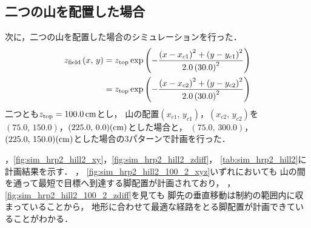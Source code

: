 \documentclass[autodetect-engine,dvipdfmx-if-dvi,ja=standard,a4j,jbase=11pt,magstyle=nomag*]{bxjsreport}
\begin{document}
\subsection{二つの山を配置した場合}
次に，二つの山を配置した場合のシミュレーションを行った．
\begin{equation}
    \begin{aligned}
        z_{\mathrm{field}}\left( x ,\, y \right) & = z_{\mathrm{top}} \exp \left( - \frac{ \left( x - x_{c1} \right)^2 + \left( y - y_{c1} \right)^2}{2.0 \left( 30.0 \right)^2} \right) \\
                                         & = z_{\mathrm{top}} \exp \left( - \frac{ \left( x - x_{c2} \right)^2 + \left( y - y_{c2} \right)^2}{2.0 \left( 30.0 \right)^2} \right)
    \end{aligned}
\end{equation}
二つとも$z_{\mathrm{top}} = 100.0\,\si{\centi\meter}$とし，
山の配置$(x_{c1} ,\, y_{c1})$，$(x_{c2} ,\, y_{c2})$を
$(75.0 ,\, 150.0)$，$(225.0 ,\, 0.0) (\si{\centi\meter})$とした場合と，
$(75.0 ,\, 300.0)$，$(225.0 ,\, 150.0) (\si{\centi\meter})$とした場合の3パターンで計画を行った．

，\cref{fig:sim_hrp2_hill2_xy}，\cref{fig:sim_hrp2_hill2_zdiff}，
\cref{tab:sim_hrp2_hill2}に計画結果を示す．
，
\cref{fig:sim_hrp2_hill2_100_2_xyz}いずれにおいても
山の間を通って最短で目標へ到達する脚配置が計画されており，
，
\cref{fig:sim_hrp2_hill2_100_2_zdiff}を見ても
脚先の垂直移動は制約の範囲内に収まっていることから，
地形に合わせて最適な経路をとる脚配置が計画できていることがわかる．
\end{document}
